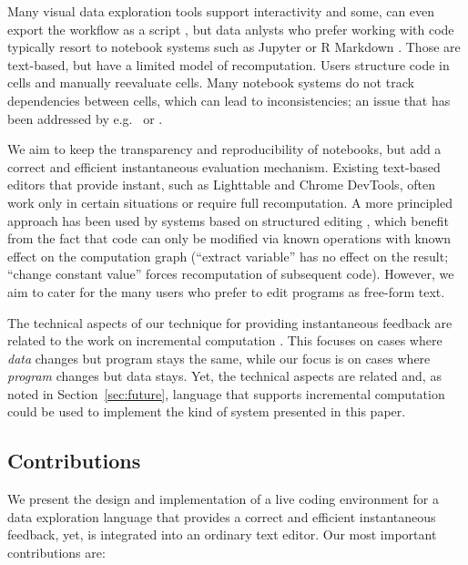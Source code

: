 \documentclass[acmsmall,anonymous,fleqn]{acmart}\settopmatter{printfolios=false,printccs=false,printacmref=false}
\theoremstyle{plain}
\theoremstyle{definition}
\begin{document}
Many visual data exploration tools support interactivity \cite{control,tableau,vizdom} and some,
can even export the workflow as a script \cite{wrangler}, but data anlysts who prefer working with
code typically resort to notebook systems such as Jupyter or R Markdown \cite{jupyter,rmarkdown}.
Those are text-based, but have a limited model of recomputation. Users structure code in
cells and manually reevaluate cells. Many notebook systems do not track dependencies
between cells, which can lead to inconsistencies; an issue that has been addressed
by e.g.~\citet{dataflow,noworkflow} or \citet{wrattler}.

We aim to keep the transparency and reproducibility of notebooks, but add a correct and
efficient instantaneous evaluation mechanism. Existing text-based editors that provide instant,
such as Lighttable \cite{lighttable} and Chrome DevTools, often work only in certain
situations or require full recomputation. A more principled approach has been used by
systems based on structured editing \cite{livenut,lamdu}, which benefit from the fact that code
can only be modified via known operations with known effect on the computation graph
(``extract variable'' has no effect on the result; ``change constant value''
forces recomputation of subsequent code). However, we aim to cater for the many users who
prefer to edit programs as free-form text.

The technical aspects of our technique for providing instantaneous feedback
are related to the work on incremental computation \cite{selfadjusting,incremental}. This focuses
on cases where \emph{data} changes but program stays the same, while our focus is on cases where
\emph{program} changes but data stays. Yet, the technical aspects are related and,
as noted in Section~\ref{sec:future}, language that supports incremental computation could be used
to implement the kind of system presented in this paper.

\subsection{Contributions}
We present the design and implementation of a live coding environment for a data exploration
language that provides a correct and efficient instantaneous feedback, yet, is integrated into an
ordinary text editor. Our most important contributions are:
\end{document}
